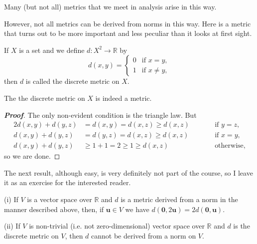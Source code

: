 Many (but not all) metrics that we meet in analysis arise in this way.

However, not all metrics can be derived from norms in this way. Here is a metric that turns out to be more important and less peculiar than it looks at first sight.

\begin{definition} If $X$ is a set and we define
$d:X^{2}\rightarrow{\mathbb R}$ by
\begin{equation*}
d(x,y)=
\begin{cases}
0&\text{if $x=y$},\\
1&\text{if $x\neq y$},
\end{cases}
\end{equation*}
then $d$ is called the discrete metric on $X$.
\end{definition}






\begin{theorem}
The the discrete metric on $X$ is indeed a metric.
\end{theorem}
\begin{proof}[\bf Proof] The only non-evident condition is the triangle law.
But
\begin{alignat*}{2}
d(x,y)+d(y,z)&=d(x,y)=d(x,z)\geq d(x,z)&&\qquad\text{if $y=z$},\\
d(x,y)+d(y,z)&=d(y,z)=d(x,z)\geq d(x,z)&&\qquad\text{if $x=y$},\\
d(x,y)+d(y,z)&\geq 1+1=2\geq 1\geq d(x,z)&&\qquad\text{otherwise,}
\end{alignat*}
so we are done.
\end{proof}

The next result, although easy,
is very definitely not part of the course,
so I leave it as an exercise for the interested reader.
\begin{problem} (i) If $V$ is a vector space over ${\mathbb R}$
and $d$ is a metric derived from a norm in the manner described above,
then, if ${\mathbf u}\in V$
we have $d({\mathbf  0},2{\mathbf u})=2d({\mathbf  0},{\mathbf u})$.

(ii) If $V$ is non-trivial (i.e. not zero-dimensional) vector space
over ${\mathbb R}$ and $d$ is the discrete metric on $V$, then
$d$ cannot be derived from a norm on $V$.
\end{problem}

